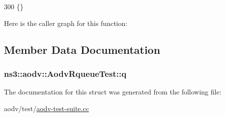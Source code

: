 \begin{DoxyCode}
300 \{\}
\end{DoxyCode}


Here is the caller graph for this function\+:




\subsection{Member Data Documentation}
\subsubsection[{\texorpdfstring{q}{q}}]{ ns3\+::aodv\+::\+Aodv\+Rqueue\+Test\+::q}\hypertarget{structns3_1_1aodv_1_1AodvRqueueTest_a32638518e269cb5974f15010da9d48cf}{}\label{structns3_1_1aodv_1_1AodvRqueueTest_a32638518e269cb5974f15010da9d48cf}


The documentation for this struct was generated from the following file\+:\begin{DoxyCompactItemize}
\item 
aodv/test/\hyperlink{aodv-test-suite_8cc}{aodv-\/test-\/suite.\+cc}\end{DoxyCompactItemize}
